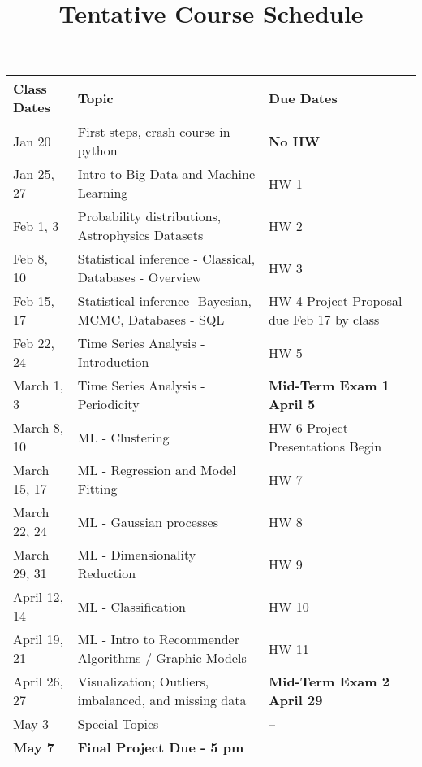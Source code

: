 \documentclass[12pt]{article}
\begin{document}
\begin{table}[h]
\small
\title{\bf \Large Tentative Course Schedule}
\centering
\begin{tabular}{|p{25mm}|p{70mm}|p{35mm}|}
\hline
Class Dates & Topic & Due Dates \\
\hline
Jan 20 & First steps, crash course in python & {\bf No HW} \\
\hline
Jan 25, 27 & Intro to Big Data and Machine Learning & HW 1 \\
 \hline
Feb 1, 3 & Probability distributions, Astrophysics Datasets  & HW 2 \\
 \hline
Feb 8, 10 & Statistical inference - Classical, Databases - Overview  & HW 3  \\
\hline
Feb 15, 17 & Statistical inference -Bayesian,  MCMC, Databases - SQL   & HW 4 \newline Project Proposal due Feb 17 by class \\
 \hline
Feb 22, 24 & Time Series Analysis - Introduction & HW 5 \\
 \hline
March 1, 3 & Time Series Analysis - Periodicity & {\bf Mid-Term Exam 1} {\bf April 5}  \\
 \hline
March 8, 10 & ML - Clustering & HW 6 \newline Project Presentations Begin \\
 \hline
March 15, 17 & ML - Regression and Model Fitting & HW 7  \\ 
 \hline
 March 22, 24 & ML - Gaussian processes  & HW 8 \\ 
 \hline
 March 29, 31 & ML - Dimensionality Reduction & HW 9 \\
 \hline 
April 12, 14 & ML - Classification & HW 10 \\
 \hline
April 19, 21 & ML - Intro to Recommender Algorithms / Graphic Models  &HW 11 \\
 \hline
 April 26, 27 & Visualization; Outliers, imbalanced, and missing data  & \bf Mid-Term Exam 2 {\bf April 29} \\
 \hline
May 3 & Special Topics & -- \\
 \hline
{\bf May 7} & {\bf Final Project Due - 5 pm} & ~\\ 
\hline
\end{tabular}
\label{tab:chisq}
\end{table}
\clearpage
\end{document}
